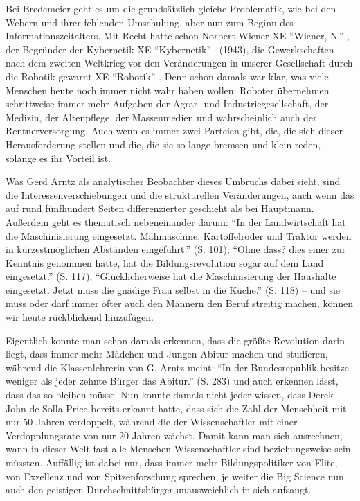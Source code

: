 \documentclass[a4paper,
fontsize=11pt,
oneside,
numbers=noperiodatend,
parskip=half-,
bibliography=totoc,
final
]{scrartcl}
\begin{document}
Bei Bredemeier geht es um die grundsätzlich gleiche Problematik, wie bei
den Webern und ihrer fehlenden Umschulung, aber nun zum Beginn des
Informationszeitalters. Mit Recht hatte schon Norbert Wiener XE
\enquote{Wiener, N.} , der Begründer der Kybernetik XE
\enquote{Kybernetik}~ (1943), die Gewerkschaften nach dem zweiten
Weltkrieg vor den Veränderungen in unserer Gesellschaft durch die
Robotik gewarnt XE \enquote{Robotik} . Denn schon damals war klar, was
viele Menschen heute noch immer nicht wahr haben wollen: Roboter
übernehmen schrittweise immer mehr Aufgaben der Agrar- und
Industriegesellschaft, der Medizin, der Altenpflege, der Massenmedien
und wahrscheinlich auch der Rentnerversorgung. Auch wenn es immer zwei
Parteien gibt, die, die sich dieser Herausforderung stellen und die, die
sie so lange bremsen und klein reden, solange es ihr Vorteil ist.~

Was Gerd Arntz als analytischer Beobachter dieses Umbruchs dabei sieht,
sind die Interessenverschiebungen und die strukturellen Veränderungen,
auch wenn das auf rund fünfhundert Seiten differenzierter geschieht als
bei Hauptmann. Außerdem geht es thematisch nebeneinander darum:
\enquote{In der Landwirtschaft hat die Maschinisierung eingesetzt.
Mähmaschine, Kartoffelroder und Traktor werden in kürzestmöglichen
Abständen eingeführt.} (S. 101); \enquote{Ohne dass? dies einer zur
Kenntnis genommen hätte, hat die Bildungsrevolution sogar auf dem Land
eingesetzt.} (S. 117); \enquote{Glücklicherweise hat die Maschinisierung
der Haushalte eingesetzt. Jetzt muss die gnädige Frau selbst in die
Küche.} (S. 118) -- und sie muss oder darf immer öfter auch den Männern
den Beruf streitig machen, können wir heute rückblickend hinzufügen.

Eigentlich konnte man schon damals erkennen, dass die größte Revolution
darin liegt, dass immer mehr Mädchen und Jungen Abitur machen und
studieren, während die Klassenlehrerin von G. Arntz meint: \enquote{In
der Bundesrepublik besitze weniger als jeder zehnte Bürger das Abitur.}
(S. 283) und auch erkennen lässt, dass das so bleiben müsse. Nun konnte
damals nicht jeder wissen, dass Derek John de Solla Price bereits
erkannt hatte, dass sich die Zahl der Menschheit mit nur 50 Jahren
verdoppelt, während die der Wissenschaftler mit einer Verdopplungsrate
von nur 20 Jahren wächst. Damit kann man sich ausrechnen, wann in dieser
Welt fast alle Menschen Wissenschaftler sind beziehungsweise sein
müssten. Auffällig ist dabei nur, dass immer mehr Bildungspolitiker von
Elite, von Exzellenz und von Spitzenforschung sprechen, je weiter die
Big Science nun auch den geistigen Durchschnittsbürger unausweichlich in
sich aufsaugt.~
\end{document}
